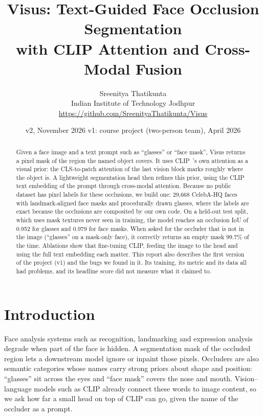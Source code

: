 \documentclass[11pt,a4paper]{article}
\title{\textbf{Visus: Text-Guided Face Occlusion Segmentation\\with CLIP Attention and Cross-Modal Fusion}}
\author{
  Sreenitya Thatikunta\\[4pt]
  \normalsize Indian Institute of Technology Jodhpur\\[2pt]
  \normalsize\url{https://github.com/SreenityaThatikunta/Visus}
}
\date{v2, November 2026 \quad\textbullet\quad v1: course project (two-person team), April 2026}
\begin{document}
\maketitle

\begin{abstract}
Given a face image and a text prompt such as ``glasses'' or ``face mask'', Visus returns a pixel mask
of the region the named object covers. It uses CLIP~\cite{radford2021clip}'s own attention as a
visual prior: the CLS-to-patch attention of the last vision block marks roughly where the object is.
A lightweight segmentation head then refines this prior, using the CLIP text embedding of the prompt
through cross-modal attention. Because no public dataset has pixel labels for these occlusions, we
build one: 29,668 CelebA-HQ faces with landmark-aligned face masks and procedurally drawn glasses,
where the labels are exact because the occlusions are composited by our own code. On a held-out
test split, which uses mask textures never seen in training, the model reaches an occlusion IoU of
0.952 for glasses and 0.979 for face masks. When asked for the occluder that is not in the image
(``glasses'' on a mask-only face), it correctly returns an empty mask 99.7\% of the time. Ablations
show that fine-tuning CLIP, feeding the image to the head and using the full text embedding each
matter. This report also describes the first
version of the project (v1) and the bugs we found in it. Its training, its metric and its data all had
problems, and its headline score did not measure what it claimed to.
\end{abstract}

\section{Introduction}

Face analysis systems such as recognition, landmarking and expression analysis degrade when part of
the face is hidden. A segmentation mask of the occluded region lets a downstream model ignore or
inpaint those pixels. Occluders are also semantic categories whose names carry strong priors about
shape and position: ``glasses'' sit across the eyes and ``face mask'' covers the nose and mouth.
Vision--language models such as CLIP already connect these words to image content, so we ask how far a
small head on top of CLIP can go, given the name of the occluder as a prompt.
\end{document}
